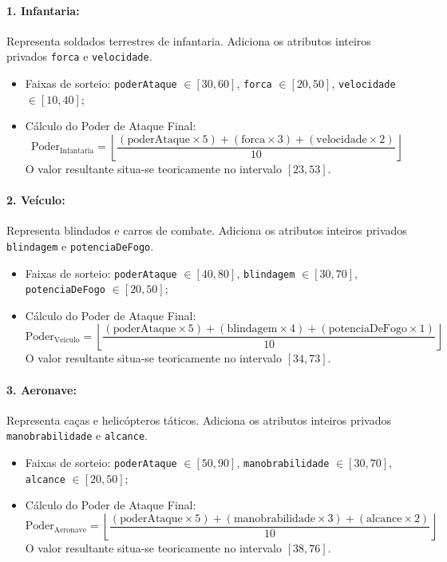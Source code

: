 \documentclass[12pt,a4paper]{article}
\begin{document}
\paragraph{1. Infantaria:}
Representa soldados terrestres de infantaria. Adiciona os atributos inteiros privados \texttt{forca} e \texttt{velocidade}.
\begin{itemize}
    \item Faixas de sorteio: \texttt{poderAtaque} $\in [30, 60]$, \texttt{forca} $\in [20, 50]$, \texttt{velocidade} $\in [10, 40]$;
    \item Cálculo do Poder de Ataque Final:
    \begin{equation}
        \text{Poder}_{\text{Infantaria}} = \left\lfloor \frac{(\text{poderAtaque} \times 5) + (\text{forca} \times 3) + (\text{velocidade} \times 2)}{10} \right\rfloor
    \end{equation}
    O valor resultante situa-se teoricamente no intervalo $[23, 53]$.
\end{itemize}

\paragraph{2. Veículo:}
Representa blindados e carros de combate. Adiciona os atributos inteiros privados \texttt{blindagem} e \texttt{potenciaDeFogo}.
\begin{itemize}
    \item Faixas de sorteio: \texttt{poderAtaque} $\in [40, 80]$, \texttt{blindagem} $\in [30, 70]$, \texttt{potenciaDeFogo} $\in [20, 50]$;
    \item Cálculo do Poder de Ataque Final:
    \begin{equation}
        \text{Poder}_{\text{Veiculo}} = \left\lfloor \frac{(\text{poderAtaque} \times 5) + (\text{blindagem} \times 4) + (\text{potenciaDeFogo} \times 1)}{10} \right\rfloor
    \end{equation}
    O valor resultante situa-se teoricamente no intervalo $[34, 73]$.
\end{itemize}

\paragraph{3. Aeronave:}
Representa caças e helicópteros táticos. Adiciona os atributos inteiros privados \texttt{manobrabilidade} e \texttt{alcance}.
\begin{itemize}
    \item Faixas de sorteio: \texttt{poderAtaque} $\in [50, 90]$, \texttt{manobrabilidade} $\in [30, 70]$, \texttt{alcance} $\in [20, 50]$;
    \item Cálculo do Poder de Ataque Final:
    \begin{equation}
        \text{Poder}_{\text{Aeronave}} = \left\lfloor \frac{(\text{poderAtaque} \times 5) + (\text{manobrabilidade} \times 3) + (\text{alcance} \times 2)}{10} \right\rfloor
    \end{equation}
    O valor resultante situa-se teoricamente no intervalo $[38, 76]$.
\end{itemize}
\end{document}
